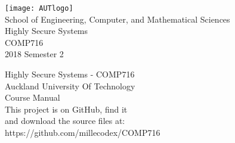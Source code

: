 \documentclass[a4paper]{book}
\begin{document}
  \newenvironment{theorem}[1]{\vspace{2mm}\noindent\textsc{#1}: }{\vspace{2mm}}
  \newtheorem{exercise}{Exercise}[chapter]

  \renewcommand{\Do}{\textbf{do}\addtocounter{indent}{1}}
  \renewcommand{\Then}{\textbf{then}\addtocounter{indent}{1}}
  \renewcommand{\Else}{\kill\addtocounter{indent}{-1}\liprint\textbf{else}\>\>\addtocounter{indent}{1}}
  \renewcommand{\ElseIf}{\kill\addtocounter{indent}{-1}\liprint\textbf{else if} }
  \renewcommand{\Until}{\kill\addtocounter{indent}{-1}\liprint\textbf{until}\hspace{1ex}}

 \frontmatter
 \begin{titlepage}
 	\begin{center}
 		
 		\texttt{[image: AUTlogo]}\\
 		{\vspace{2cm}}
 		{\Large School of Engineering, Computer, and Mathematical Sciences}
 		\vspace{3cm}\\
 		{\huge Highly Secure Systems}\\
 		\vspace{1cm}
 		{\huge COMP716} \\
 		\vspace{1cm}
 		{\huge 2018 Semester 2} \\
 		\vfill
 	\end{center}
 \end{titlepage}
 
 \clearpage\thispagestyle{empty}
   \vspace*{\fill}
 Highly Secure Systems - COMP716\\
 Auckland University Of Technology\\
 Course Manual\\
 
 This project is on GitHub, find it \\
 and download the source files at: \\
 https://github.com/millecodex/COMP716 \\                            
                                                                      
\end{document}
